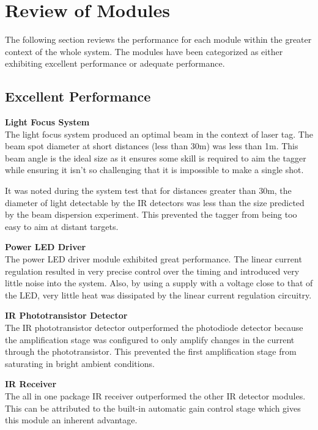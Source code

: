 \section{Review of Modules}
The following section reviews the performance for each module within the greater context of the whole system. The modules have been categorized as either exhibiting excellent performance or adequate performance.




\subsection{Excellent Performance}

\textbf{Light Focus System}\\
The light focus system produced an optimal beam in the context of laser tag. The beam spot diameter at short distances (less than 30m) was less than 1m. This beam angle is the ideal size as it ensures some skill is required to aim the tagger while ensuring it isn't so challenging that it is impossible to make a single shot.

It was noted during the system test that for distances greater than 30m, the diameter of light detectable by the IR detectors was less than the size predicted by the beam dispersion experiment. This prevented the tagger from being too easy to aim at distant targets.

\textbf{Power LED Driver}\\
The power LED driver module exhibited great performance. The linear current regulation resulted in very precise control over the timing and introduced very little noise into the system. Also, by using a supply with a voltage close to that of the LED, very little heat was dissipated by the linear current regulation circuitry.

\textbf{IR Phototransistor Detector}\\
The IR phototransistor detector outperformed the photodiode detector because the amplification stage was configured to only amplify changes in the current through the phototransistor. This prevented the first amplification stage from saturating in bright ambient conditions.

\textbf{IR Receiver}\\
The all in one package IR receiver outperformed the other IR detector modules. This can be attributed to the built-in automatic gain control stage which gives this module an inherent advantage.


